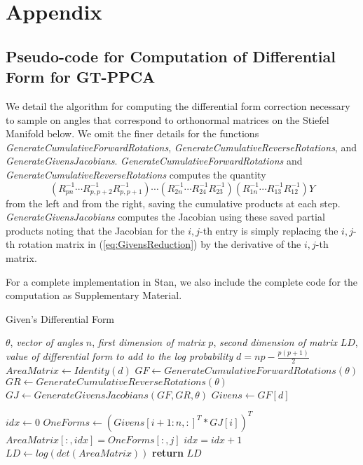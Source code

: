 \documentclass{article}
\begin{document}
\renewcommand{\algorithmicrequire}{\textbf{Input:}}
\renewcommand{\algorithmicensure}{\textbf{Output:}}

\section{Appendix}

\subsection{Pseudo-code for Computation of Differential Form for GT-PPCA}

We detail the algorithm for computing the differential form correction necessary to sample on angles that correspond to orthonormal matrices on the Stiefel Manifold below. We omit the finer details for the functions \textit{GenerateCumulativeForwardRotations}, \textit{GenerateCumulativeReverseRotations}, and \textit{GenerateGivensJacobians}. \textit{GenerateCumulativeForwardRotations} and \textit{GenerateCumulativeReverseRotations} computes the quantity 
\begin{equation}
\label{eq:GivensReduction}
(R_{pn}^{-1} \cdots R_{p,p+2}^{-1} R_{p,p+1}^{-1}) \cdots (R_{2n}^{-1} \cdots R_{24}^{-1} R_{23}^{-1})(R_{1n}^{-1} \cdots R_{13}^{-1}  R_{12}^{-1})Y
\end{equation}
from the left and from the right, saving the cumulative products at each step.  \textit{GenerateGivensJacobians} computes the Jacobian using these saved partial products noting that the Jacobian for the $i, j$-th entry is simply replacing the $i,j$-th rotation matrix in (\ref{eq:GivensReduction}) by the derivative of the $i,j$-th matrix.

For a complete implementation in Stan, we also include the complete code for the computation as Supplementary Material.

\begin{algorithm}
\caption{Given's Differential Form}\label{alg:diffForm}
\begin{algorithmic}[1]
\Require
	\Statex $\theta$, \textit{vector of angles}
	\Statex $n$, \textit{first dimension of matrix}
	\Statex $p$, \textit{second dimension of matrix}
\Ensure
	\Statex $LD$, \textit{value of differential form to add to the log probability}
\State $d = np - \frac{p(p+1)}{2}$
\State $AreaMatrix\gets Identity(d)$
\State $GF\gets GenerateCumulativeForwardRotations(\theta)$
\State $GR\gets GenerateCumulativeReverseRotations(\theta)$
\State $GJ\gets GenerateGivensJacobians(GF, GR,\theta)$
\State $Givens\gets GF[d]$

\State $idx\gets 0$
	\State $OneForms\gets (Givens[i+1:n,:]^T * GJ[i])^T$
		\State $AreaMatrix[:,idx] = OneForms[:,j]$
		\State $idx = idx + 1$
	\EndFor
\EndFor
\State $LD\gets log(det(AreaMatrix))$
\State \textbf{return} $LD$
\EndFunction
\end{algorithmic}
\end{algorithm}
\end{document}
